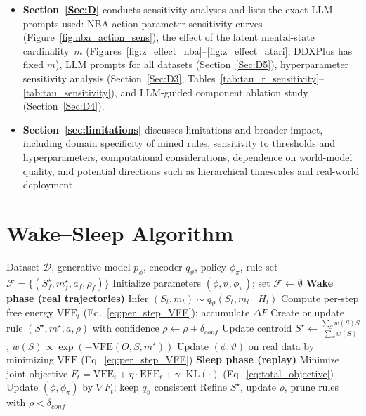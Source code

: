 \documentclass{article} %
\newcommand{\revise}[1]{#1}
\begin{document}
\begin{itemize}
  \item \textbf{Section~\ref{Sec:D}} conducts sensitivity analyses and lists the exact LLM prompts used: 
  NBA action-parameter sensitivity curves (Figure~\ref{fig:nba_action_sens}), 
  the effect of the latent mental-state cardinality~$m$ (Figures~\ref{fig:z_effect_nba}--\ref{fig:z_effect_atari}; 
  DDXPlus has fixed $m$), LLM prompts for all datasets (Section~\ref{Sec:D5}), 
  \revise{hyperparameter sensitivity analysis (Section~\ref{Sec:D3}, Tables~\ref{tab:tau_r_sensitivity}--\ref{tab:tau_sensitivity}), 
  and LLM-guided component ablation study (Section~\ref{Sec:D4}).}

  \item \textbf{Section~\ref{sec:limitations}} discusses limitations and broader impact, 
  including domain specificity of mined rules, sensitivity to thresholds and hyperparameters, 
  computational considerations, dependence on world-model quality, and potential directions such as 
  hierarchical timescales and real-world deployment.
\end{itemize}



\section{Wake–Sleep Algorithm}
\label{Sec:A}

\begin{algorithm}[ht]
\caption{Rule-Guided Active Inference: Unified Wake–Sleep Cycle}
\label{alg:rule-guided-active-inference}
\begin{algorithmic}[1]
\Require Dataset $\mathcal D$, generative model $p_{\phi}$, encoder $q_{\vartheta}$, policy $\phi_{\pi}$, rule set $\mathcal F=\{(S_f^\star,m_f^\star,a_f,\rho_f)\}$
\State Initialize parameters $(\phi,\vartheta,\phi_{\pi})$; set $\mathcal F\leftarrow\emptyset$
  \State \textbf{Wake phase (real trajectories)}
      \State Infer $(S_t,m_t)\sim q_{\vartheta}(S_t,m_t\mid H_t)$
      \State Compute per-step free energy $\mathrm{VFE}_t$ (Eq.~\ref{eq:per_step_VFE}); accumulate $\Delta F$
        \State Create or update rule $(S^\star,m^\star,a,\rho)$ with confidence $\rho\gets\rho+\delta_{conf}$
        \State Update centroid $S^\star \gets \frac{\sum_{S} w(S)S}{\sum_{S} w(S)}$, $w(S)\!\propto\!\exp(-\mathrm{VFE}(O,S,m^\star))$
      \EndIf
    \EndFor
  \EndFor
  \State Update $(\phi,\vartheta)$ on real data by minimizing $\mathrm{VFE}$ (Eq.~\ref{eq:per_step_VFE})
  \Statex
  \State \textbf{Sleep phase (replay)}
    \State Minimize joint objective $F_t=\mathrm{VFE}_t+\eta\cdot\mathrm{EFE}_t+\gamma\cdot\mathrm{KL}(\cdot)$ (Eq.~\ref{eq:total_objective})
    \State Update $(\phi,\phi_{\pi})$ by $\nabla F_t$; keep $q_{\vartheta}$ consistent
    \State Refine $S^\star$, update $\rho$, prune rules with $\rho<\delta_{conf}$
  \EndFor
\EndFor
\end{algorithmic}
\end{algorithm}
\end{document}
